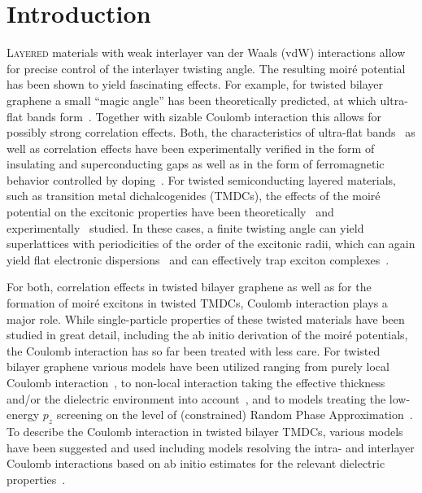 \section{Introduction}

\lettrine[lines=3]{L}{ayered} materials with weak interlayer van der Waals (vdW) interactions allow for precise control of the interlayer twisting angle. The resulting moir\'e potential has been shown to yield fascinating effects. For example, for twisted bilayer graphene a small ``magic angle'' has been theoretically predicted, at which ultra-flat bands form~\cite{suarez_morell_flat_2010,bistritzer_moire_2011}. Together with sizable Coulomb interaction this allows for possibly strong correlation effects. Both, the characteristics of ultra-flat bands~\cite{li_observation_2010} as well as correlation effects have been experimentally verified in the form of insulating and superconducting gaps as well as in the form of ferromagnetic behavior controlled by doping~\cite{cao_correlated_2018,cao_unconventional_2018,yankowitz_tuning_2019,sharpe_emergent_2019}. For twisted semiconducting layered materials, such as transition metal dichalcogenides (TMDCs), the effects of the moir\'e potential on the excitonic properties have been theoretically~\cite{wu_topological_2017,danovich_localized_2018,wu_hubbard_2018,brem_tunable_2020,choi_twist_2021} and experimentally~\cite{tran_evidence_2019,seyler_signatures_2019,zhang_twist-angle_2020} studied. In these cases, a finite twisting angle can yield superlattices with periodicities of the order of the excitonic radii, which can again yield flat electronic dispersions~\cite{li_imaging_2021,angeli__2021} and can effectively trap exciton complexes~\cite{seyler_signatures_2019,brem_tunable_2020}. 

For both, correlation effects in twisted bilayer graphene as well as for the formation of moir\'e excitons in twisted TMDCs, Coulomb interaction plays a major role. While single-particle properties of these twisted materials have been studied in great detail, including the ab initio derivation of the moir\'e potentials, the Coulomb interaction has so far been treated with less care.  For twisted bilayer graphene various models have been utilized ranging from purely local Coulomb interaction~\cite{cao_correlated_2018}, to non-local interaction taking the effective thickness and/or the dielectric environment into account~\cite{goodwin_twist-angle_2019,cea_band_2020,bernevig_twisted_2021,liu_tuning_2021}, and to models treating the low-energy $p_z$ screening on the level of (constrained) Random Phase Approximation~\cite{pizarro_internal_2019,goodwin_attractive_2019}. To describe the Coulomb interaction in twisted bilayer TMDCs, various models have been suggested and used including models resolving the intra- and interlayer Coulomb interactions based on ab initio estimates for the relevant dielectric properties~\cite{danovich_localized_2018,brem_tunable_2020,choi_twist_2021}.
    
